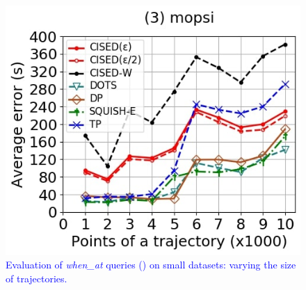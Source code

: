 {\begin{figure}[tb!]
	\includegraphics[scale=0.250]{Figures/Exp-when-SED-error-size-mopsi.jpg}		
	\vspace{-2ex}
	\caption{\small \textcolor{blue}{Evaluation of \emph{when\_at} queries (\sed) on small datasets: varying the size of
		trajectories.}}
	\label{fig:query-when-sed-size}
	\vspace{-1ex}
\end{figure}


}
